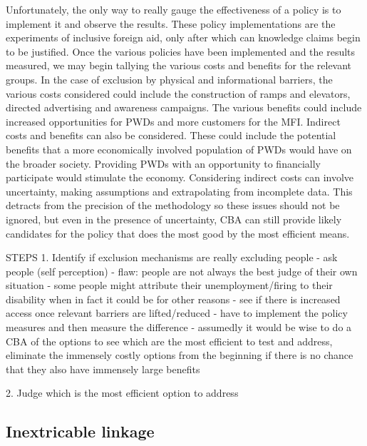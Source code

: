 \documentclass[a4paper]{article}
\begin{document}
Unfortunately, the only way to really gauge the effectiveness of a policy is
to implement it and observe the results. These policy implementations are the
experiments of inclusive foreign aid, only after which can knowledge claims
begin to be justified.  Once the various policies have been implemented and
the results measured, we may begin tallying the various costs and benefits for
the relevant groups. In the case of exclusion by physical and informational
barriers, the various costs considered could include the construction of ramps
and elevators, directed advertising and awareness campaigns. The various
benefits could include increased opportunities for PWDs and more customers for
the MFI.  Indirect costs and benefits can also be considered. These could
include the potential benefits that a more economically involved population of
PWDs would have on the broader society. Providing PWDs with an opportunity to
financially participate would stimulate the economy. Considering indirect
costs can involve uncertainty, making assumptions and extrapolating from
incomplete data. This detracts from the precision of the methodology so these
issues should not be ignored, but even in the presence of uncertainty, CBA can
still provide likely candidates for the policy that does the most good by the
most efficient means.





STEPS
1. Identify if exclusion mechanisms are really excluding people
    - ask people (self perception)
        - flaw: people are not always the best judge of their own situation
            - some people might attribute their unemployment/firing to their
            disability when in fact it could be for other reasons
    - see if there is increased access once relevant barriers are
      lifted/reduced
        - have to implement the policy measures and then measure the
          difference
        - assumedly it would be wise to do a CBA of the options to see which
        are the most efficient to test and address, eliminate the immensely
        costly options from the beginning if there is no chance that they also
        have immensely large benefits

2. Judge which is the most efficient option to address



\subsection{Inextricable linkage}
\end{document}
